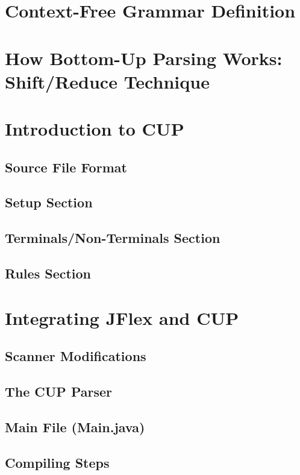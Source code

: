 \section{Context-Free Grammar Definition}

\section{How Bottom-Up Parsing Works: Shift/Reduce Technique}

\section{Introduction to CUP}

\subsection{Source File Format}

\subsection{Setup Section}

\subsection{Terminals/Non-Terminals Section}

\subsection{Rules Section}

\section{Integrating JFlex and CUP}

\subsection{Scanner Modifications}

\subsection{The CUP Parser}

\subsection{Main File (Main.java)}

\subsection{Compiling Steps}